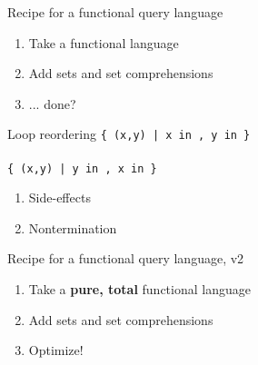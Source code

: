 \documentclass[xcolor=table,usenames,dvipsnames,svgnames]{beamer}
\newcommand{\df}{\color{RoyalBlue}}
\begin{document}

\begin{frame}{Recipe for a functional query language}\Large

  \begin{enumerate}\itemsep 1.5em
  \item Take a functional language
  \item Add sets and set comprehensions
  \item {\color{red} ... done?}
  \end{enumerate}
\end{frame}


\begin{frame}\end{frame}

\begin{frame}{Loop reordering}\large\centering
  \texttt{\alt<1>{\df}{}\{ (x,y) | x in ,
    y in \}}
  \vspace{0.5em}\\
  {\Large {}}
  \vspace{0.5em}\\
  \texttt{\alt<1>{\df}{}\{ (x,y) | y in ,
    x in \}}

  \pause
  \vspace{3em}\Large
  \begin{minipage}{0.5\textwidth}
    \begin{enumerate}
    \item {\alt<3>{\color{red}}{} Side-effects}
    \item { Nontermination}
    \end{enumerate}
  \end{minipage}
\end{frame}


\begin{frame}{Recipe for a functional query language, v2}\Large
  \begin{enumerate}\itemsep 1.5em
  \item Take a \textbf{pure, total} functional language
  \item Add sets and set comprehensions
  \item {\color{orange} Optimize!}
  \end{enumerate}
\end{frame}
\end{document}
